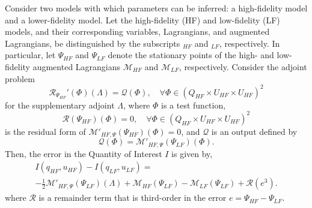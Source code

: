 \begin{theorem}
Consider two models with which parameters can be inferred: a high-fidelity model and a lower-fidelity model. Let the high-fidelity (HF) and low-fidelity (LF) models, and their corresponding variables, Lagrangians, and augmented Lagrangians, be distinguished by the subscripts $_{HF}$ and $_{LF}$, respectively. In particular, let $\Psi_{HF}$ and $\Psi_{LF}$ denote the stationary points of the high- and low- fidelity augmented Lagrangians $\mathcal{M}_{HF}$ and $\mathcal{M}_{LF}$, respectively. Consider the adjoint problem
%
\begin{equation}
\mathscr{R}_{\Psi_{HF}}'(\Phi)(\Lambda)=\mathcal{Q}(\Phi),\quad\forall\Phi\in(Q_{HF}\times U_{HF}\times U_{HF})^2
\label{eq:superAdjEq}
\end{equation}
for the supplementary adjoint $\Lambda$, where $\Phi$ is a test function,  
\begin{equation}
\mathscr{R}(\Psi_{HF})(\Phi)=0,\quad\forall\Phi\in(Q_{HF}\times U_{HF}\times U_{HF})^2
\label{eq:supadjsys}
\end{equation}
is the residual form of $\mathcal{M}'_{HF,\Psi}(\Psi_{HF})(\Phi)=0$, and $\mathcal{Q}$ is an output defined by
\begin{equation}
\mathcal{Q}(\Phi)=\mathcal{M}'_{HF,\Psi}(\Psi_{LF})(\Phi).
\label{eq:supadjout}
\end{equation}
%
Then, the error in the Quantity of Interest $I$ is given by,
%
\begin{multline}
\label{eq:finErrExp}
I(q_{HF},u_{HF})-I(q_{LF},u_{LF})=\\-\frac{1}{2}\mathcal{M}'_{HF,\Psi}(\Psi_{LF})(\Lambda)+\mathcal M_{HF}(\Psi_{LF})-\mathcal M_{LF}(\Psi_{LF})+\mathcal{R}(e^3).
\end{multline}
%
where $\mathcal{R}$ is a remainder term that is third-order in the error $e=\Psi_{HF}-\Psi_{LF}$.
\end{theorem}
%
